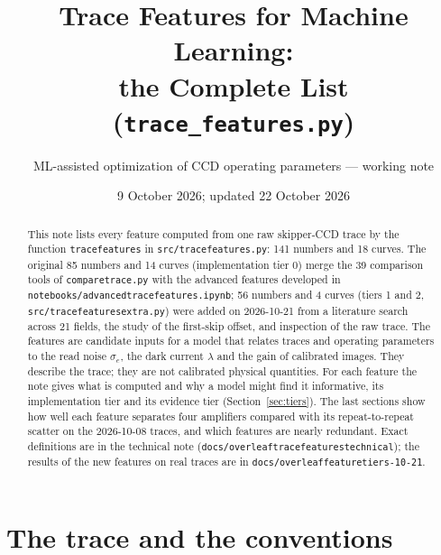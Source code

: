 \documentclass[10pt]{article}
\title{Trace Features for Machine Learning:\\ the Complete List (\texttt{trace\_features.py})}
\author{ML-assisted optimization of CCD operating parameters --- working note}
\date{9 October 2026; updated 22 October 2026}
\newcommand{\code}[1]{\texttt{#1}}
\renewcommand{\_}{\oldunderscore\allowbreak}
\begin{document}
\maketitle

\begin{abstract}
This note lists every feature computed from one raw skipper-CCD trace by the function \code{trace\_features} in
\code{src/trace\_features.py}: 141 numbers and 18 curves. The original 85 numbers and 14 curves
(implementation tier 0) merge the 39 comparison tools of \code{compare\_trace.py} with the advanced features developed in
\code{notebooks/advanced\_trace\_features.ipynb}; 56 numbers and 4 curves
(tiers 1 and 2, \code{src/trace\_features\_extra.py}) were added on 2026-10-21 from a literature search across 21 fields, the
study of the first-skip offset, and inspection of the raw trace. The features are candidate inputs for a model that relates traces and
operating parameters to the read noise $\sigma_e$, the dark current $\lambda$ and the gain of calibrated images. They describe
the trace; they are not calibrated physical quantities. For each feature the note gives what is computed and why a model
might find it informative, its implementation tier and its evidence tier (Section~\ref{sec:tiers}). The last sections show how
well each feature separates four amplifiers compared with its repeat-to-repeat scatter on the 2026-10-08 traces, and which
features are nearly redundant. Exact definitions are in the technical note (\code{docs/overleaf\_trace\_features\_technical});
the results of the new features on real traces are in \code{docs/overleaf\_feature\_tiers\_2026-10-21}.
\end{abstract}

\tableofcontents

\section{The trace and the conventions}
\end{document}

